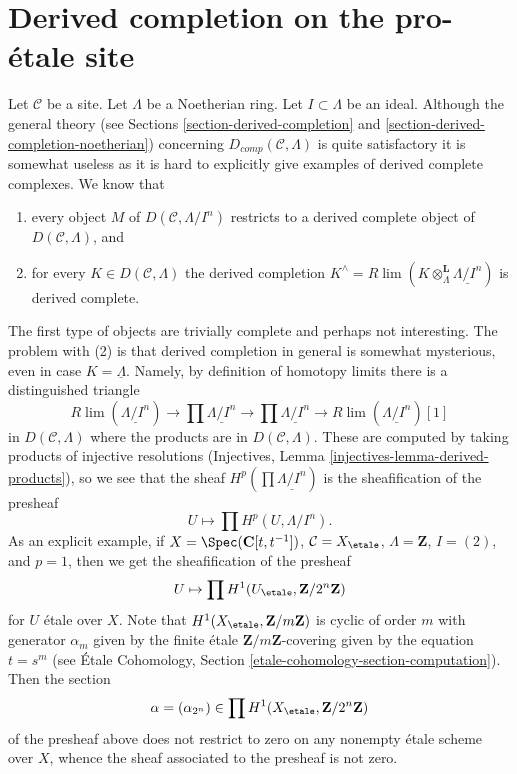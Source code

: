 \section{Derived completion on the pro-\'etale site}
\label{section-derived-completion-proetale}

\noindent
Let $\mathcal{C}$ be a site. Let $\Lambda$ be a Noetherian ring.
Let $I \subset \Lambda$ be an ideal. Although the general theory
(see Sections \ref{section-derived-completion} and
\ref{section-derived-completion-noetherian})
concerning $D_{comp}(\mathcal{C}, \Lambda)$ is quite satisfactory
it is somewhat useless as it is hard to explicitly give
examples of derived complete complexes. We know that
\begin{enumerate}
\item every object $M$ of $D(\mathcal{C}, \Lambda/I^n)$ restricts to a
derived complete object of $D(\mathcal{C}, \Lambda)$, and
\item for every $K \in D(\mathcal{C}, \Lambda)$ the derived completion
$K^\wedge = R\lim (K \otimes_\Lambda^\mathbf{L} \underline{\Lambda/I^n})$
is derived complete.
\end{enumerate}
The first type of objects are trivially complete and perhaps not
interesting. The problem with (2) is that derived completion
in general is somewhat mysterious, even in case $K = \underline{\Lambda}$.
Namely, by definition of homotopy limits there
is a distinguished triangle
$$
R\lim(\underline{\Lambda/I^n}) \to
\prod \underline{\Lambda/I^n} \to
\prod \underline{\Lambda/I^n} \to
R\lim(\underline{\Lambda/I^n})[1]
$$
in $D(\mathcal{C}, \Lambda)$ where the products are in
$D(\mathcal{C}, \Lambda)$. These are computed by taking products
of injective resolutions
(Injectives, Lemma \ref{injectives-lemma-derived-products}),
so we see that the sheaf $H^p(\prod \underline{\Lambda/I^n})$
is the sheafification of the presheaf
$$
U \longmapsto \prod H^p(U, \Lambda/I^n).
$$
As an explicit example, if $X = \Spec(\mathbf{C}[t, t^{-1}])$,
$\mathcal{C} = X_\etale$, $\Lambda = \mathbf{Z}$, $I = (2)$, and
$p = 1$, then we get the sheafification of the presheaf
$$
U \mapsto \prod H^1(U_\etale, \mathbf{Z}/2^n\mathbf{Z})
$$
for $U$ \'etale over $X$. Note that $H^1(X_\etale, \mathbf{Z}/m\mathbf{Z})$
is cyclic of order $m$ with generator $\alpha_m$ given by the finite \'etale
$\mathbf{Z}/m\mathbf{Z}$-covering given by the equation $t = s^m$
(see \'Etale Cohomology, Section \ref{etale-cohomology-section-computation}).
Then the section
$$
\alpha = (\alpha_{2^n}) \in \prod H^1(X_\etale, \mathbf{Z}/2^n\mathbf{Z})
$$
of the presheaf above does not restrict to zero on any nonempty \'etale
scheme over $X$, whence the sheaf associated to the presheaf is not zero.

